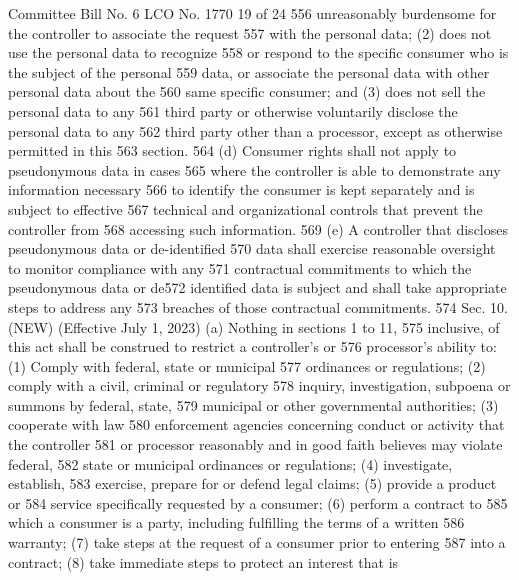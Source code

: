 Committee Bill No. 6
LCO No. 1770 19 of 24
556 unreasonably burdensome for the controller to associate the request
557 with the personal data; (2) does not use the personal data to recognize
558 or respond to the specific consumer who is the subject of the personal
559 data, or associate the personal data with other personal data about the
560 same specific consumer; and (3) does not sell the personal data to any
561 third party or otherwise voluntarily disclose the personal data to any
562 third party other than a processor, except as otherwise permitted in this
563 section.
564 (d) Consumer rights shall not apply to pseudonymous data in cases
565 where the controller is able to demonstrate any information necessary
566 to identify the consumer is kept separately and is subject to effective
567 technical and organizational controls that prevent the controller from
568 accessing such information.
569 (e) A controller that discloses pseudonymous data or de-identified
570 data shall exercise reasonable oversight to monitor compliance with any
571 contractual commitments to which the pseudonymous data or de572 identified data is subject and shall take appropriate steps to address any
573 breaches of those contractual commitments.
574 Sec. 10. (NEW) (Effective July 1, 2023) (a) Nothing in sections 1 to 11,
575 inclusive, of this act shall be construed to restrict a controller's or
576 processor's ability to: (1) Comply with federal, state or municipal
577 ordinances or regulations; (2) comply with a civil, criminal or regulatory
578 inquiry, investigation, subpoena or summons by federal, state,
579 municipal or other governmental authorities; (3) cooperate with law
580 enforcement agencies concerning conduct or activity that the controller
581 or processor reasonably and in good faith believes may violate federal,
582 state or municipal ordinances or regulations; (4) investigate, establish,
583 exercise, prepare for or defend legal claims; (5) provide a product or
584 service specifically requested by a consumer; (6) perform a contract to
585 which a consumer is a party, including fulfilling the terms of a written
586 warranty; (7) take steps at the request of a consumer prior to entering
587 into a contract; (8) take immediate steps to protect an interest that is 

